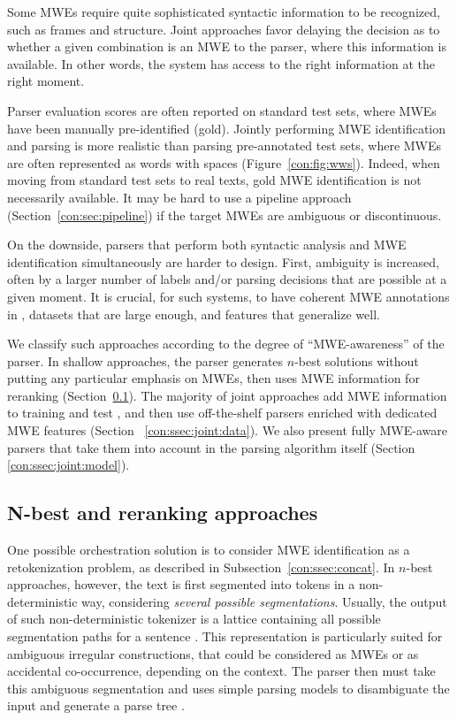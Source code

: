 \documentclass[output=paper]{langsci/langscibook}
\begin{document}
Some MWEs require quite sophisticated syntactic information to be recognized, such as  frames and  structure.
Joint approaches favor delaying the decision as to whether a given combination is an MWE to the parser, where this information is available.
In other words, the system has access to the right information at the right moment. %


Parser evaluation scores are often reported on standard test sets, where MWEs have been manually pre-identified (gold).
Jointly performing MWE identification and parsing is more realistic than parsing pre-annotated test sets, where MWEs are often represented as words with spaces (Figure~\ref{con:fig:wws}).
Indeed, when moving from standard test sets to real texts, gold MWE identification is not necessarily available.
It may be hard to use a pipeline approach (Section~\ref{con:sec:pipeline}) if the target MWEs are ambiguous or discontinuous.

On the downside, parsers that perform both syntactic analysis and MWE identification simultaneously are harder to design.
First, ambiguity is increased, often by a larger number of labels and/or parsing decisions that are possible at a given moment.
It is crucial, for such systems, to have coherent MWE annotations in , datasets that are large enough, and features that generalize well. 

We classify such approaches according to the degree of  ``MWE-awareness'' of the parser.
In shallow approaches, the parser generates $n$-best solutions without putting any particular emphasis on MWEs, then uses MWE information for reranking (Section~\ref{con:ssec:joint:rerank}).
The majority of joint approaches add MWE information to training and test , and then use off-the-shelf parsers enriched with dedicated MWE features (Section~ \ref{con:ssec:joint:data}). 
We also present fully MWE-aware parsers that take them into account in the parsing algorithm itself (Section~ \ref{con:ssec:joint:model}).


\subsection{N-best and reranking approaches }
\label{con:ssec:joint:rerank}

One possible orchestration solution is to consider MWE identification as a retokenization problem, as described in Subsection~\ref{con:ssec:concat}.
In $n$-best approaches, however, the text is first segmented into tokens in a non-deterministic way, considering \emph{several possible segmentations}.
Usually, the output of such non-deterministic tokenizer is a lattice containing all possible segmentation paths for a sentence \citep{sagot:2005}.
This representation is particularly suited for ambiguous irregular constructions, that could be considered as MWEs or as accidental co-occurrence, depending on the context.
The parser then must take this ambiguous segmentation and uses simple parsing models to disambiguate the input and generate a parse tree \citep{nasr:11}.
\end{document}
